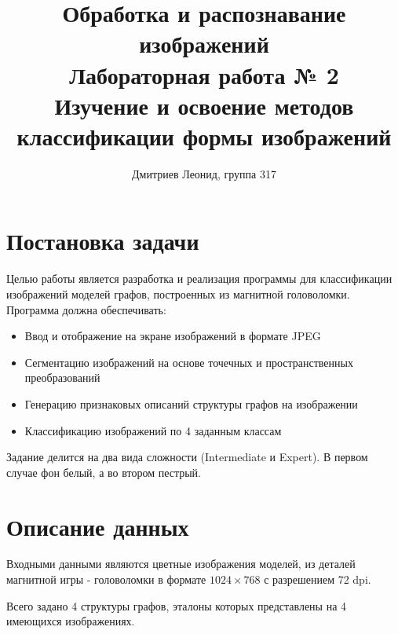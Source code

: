 \documentclass[10pt]{article}
\author{Дмитриев Леонид, группа 317}
\title{
	Обработка и распознавание изображений\\
	Лабораторная работа № 2\\
	Изучение и освоение методов классификации формы изображений
}
\begin{document}
	{
		\LARGE
		\maketitle
	}
	
	\clearpage
	
	
	{ \large \tableofcontents} 
	
	\clearpage
	
	
	
	\section*{Постановка задачи}
	
	\large
	
	
	Целью работы является разработка и реализация программы для классификации изображений моделей графов,
	построенных из магнитной головоломки.\\
	Программа должна обеспечивать:
	\begin{itemize}
		\item Ввод и отображение на экране изображений в формате JPEG
		
		\item Сегментацию изображений на основе точечных и пространственных преобразований
		
		\item Генерацию признаковых описаний структуры графов на изображении
		
		\item Классификацию изображений по 4 заданным классам
	\end{itemize}
	
	Задание делится на два вида сложности (Intermediate и Expert). В первом случае фон белый, а во втором пестрый.
	
	
	\section*{Описание данных}
	
	Входными данными являются цветные изображения моделей, из деталей магнитной игры - головоломки в формате $1024 \times 768$ с разрешением 72 dpi.
	
	Всего задано 4 структуры графов, эталоны которых представлены на 4 имеющихся изображениях.
	
\end{document}
